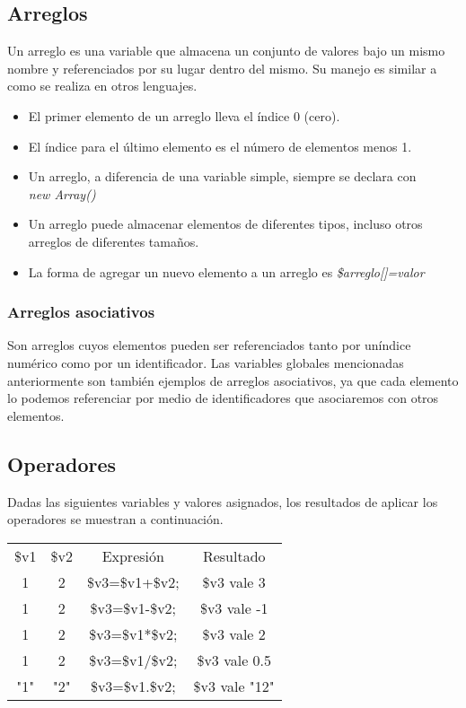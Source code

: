 \documentclass[12pt,spanish,twocolumn,lettersize]{article}
\begin{document}
\subsection{Arreglos}
Un arreglo es una variable que almacena un conjunto de valores bajo un mismo nombre y referenciados por su lugar dentro del mismo. Su manejo es similar a como se realiza en otros lenguajes.
\begin{itemize}
\item El primer elemento de un arreglo lleva el \'indice 0 (cero).
\item El \'indice para el \'ultimo elemento es el n\'umero de elementos menos 1.
\item Un arreglo, a diferencia de una variable simple, siempre se declara con\\ \emph{new Array()}
\item Un arreglo puede almacenar elementos de diferentes tipos, incluso otros arreglos de diferentes tama\~nos.
\item La forma de agregar un nuevo elemento a un arreglo es \emph{\$arreglo[]=valor}
\end{itemize}

\subsubsection{Arreglos asociativos}
Son arreglos cuyos elementos pueden ser referenciados tanto por un\'indice num\'erico como por un identificador. Las variables globales mencionadas anteriormente son tambi\'en ejemplos de arreglos asociativos, ya que cada elemento lo podemos referenciar por medio de identificadores que asociaremos con otros elementos.

\subsection{Operadores}
Dadas las siguientes variables y valores asignados, los resultados de aplicar los operadores se muestran a continuaci\'on.\\
\begin{tabular}{|c|c|c|c|}
\hline
\$v1 & \$v2 & Expresi\'on & Resultado\\ \cline{1-4}
1 & 2 & \$v3=\$v1+\$v2; & \$v3 vale 3\\
1 & 2 & \$v3=\$v1-\$v2; & \$v3 vale -1\\
1 & 2 & \$v3=\$v1*\$v2; & \$v3 vale 2\\
1 & 2 & \$v3=\$v1/\$v2; & \$v3 vale 0.5\\
"1" & "2" & \$v3=\$v1.\$v2; & \$v3 vale "12"\\ \hline
\end{tabular}
\end{document}

